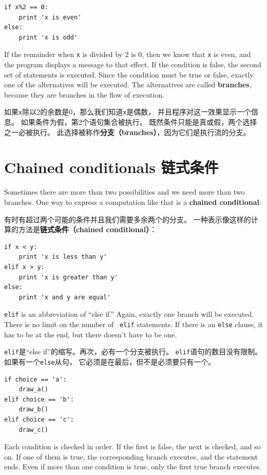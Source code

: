 \documentclass[10pt]{book}
\begin{document}
\begin{CJK}{UTF8}{gbsn}
\begin{verbatim}
if x%2 == 0:
    print 'x is even'
else:
    print 'x is odd'
\end{verbatim}
%
If the remainder when {\tt x} is divided by 2 is 0, then we
know that {\tt x} is even, and the program displays a message to that
effect.  If the condition is false, the second set of statements is
executed.  Since the condition must be true or false, exactly one of
the alternatives will be executed.  The alternatives are called
{\bf branches}, because they are branches in the flow of execution.

如果{\tt x}除以2的余数是0，那么我们知道{\tt x}是偶数，
并且程序对这一效果显示一个信息。
如果条件为假，第2个语句集合被执行。
既然条件只能是真或假，两个选择之一必被执行。
此选择被称作{\bf 分支（branches）}，因为它们是执行流的分支。

\section{Chained conditionals 链式条件}

Sometimes there are more than two possibilities and we need more than
two branches.  One way to express a computation like that is a {\bf
chained conditional}:

有时有超过两个可能的条件并且我们需要多余两个的分支。
一种表示像这样的计算的方法是{\bf 链式条件（chained conditional）}：

\begin{verbatim}
if x < y:
    print 'x is less than y'
elif x > y:
    print 'x is greater than y'
else:
    print 'x and y are equal'
\end{verbatim}
%
{\tt elif} is an abbreviation of ``else if.''  Again, exactly one
branch will be executed.  There is no limit on the number of {\tt
elif} statements.  If there is an {\tt else} clause, it has to be
at the end, but there doesn't have to be one.

{\tt elif}是``else if''的缩写。再次，必有一个分支被执行。 
{\tt elif}语句的数目没有限制。如果有一个{\tt else}从句，
它必须是在最后，但不是必须要只有一个。

\begin{verbatim}
if choice == 'a':
    draw_a()
elif choice == 'b':
    draw_b()
elif choice == 'c':
    draw_c()
\end{verbatim}
%
Each condition is checked in order.  If the first is false,
the next is checked, and so on.  If one of them is
true, the corresponding branch executes, and the statement
ends.  Even if more than one condition is true, only the
first true branch executes.  


\end{CJK}
\end{document}
